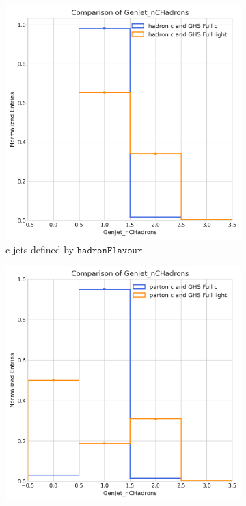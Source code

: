 \documentclass[10pt,twocolumn]{article}
\newcommand*{\hadFlav}{\texttt{hadronFlavour}}
\begin{document}
\begin{figure}[!htbp]
    \centering
    \begin{subfigure}[t]{0.48\textwidth}
        \centering
        \includegraphics[width=\textwidth]{images/compare_GenJet_nCHadrons_GHSFull_light_vs_c_filter_hadronFlavour_4.png}
        \caption{c-jets defined by $\hadFlav$}
        \label{fig:GenJet_nCHad_full_c_hadron_c}
    \end{subfigure}
    \hfill
    \begin{subfigure}[t]{0.48\textwidth}
        \centering
        \includegraphics[width=\textwidth]{images/compare_GenJet_nCHadrons_GHSFull_light_vs_c_filter_partonFlavour_4.png}

\end{subfigure}
\end{figure}
\end{document}
